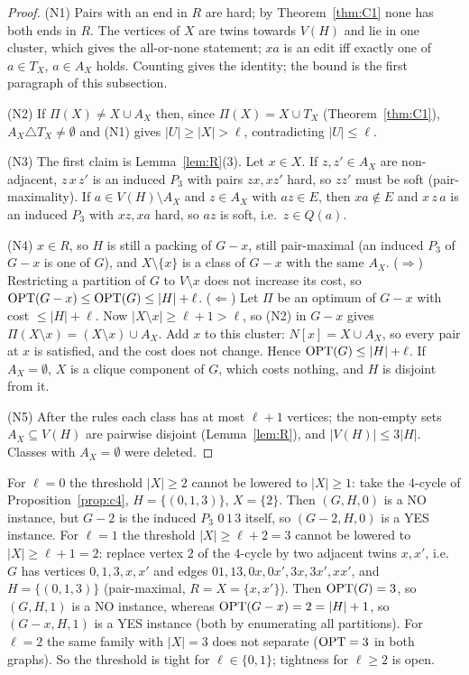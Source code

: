 \begin{proof}
(N1) Pairs with an end in $R$ are hard; by Theorem~\ref{thm:C1} none has both ends in $R$. The vertices of $X$ are twins towards $V(H)$ and lie in one cluster, which gives the all-or-none statement; $xa$ is an edit iff exactly one of $a\in T_X$, $a\in A_X$ holds. Counting gives the identity; the bound is the first paragraph of this subsection.

(N2) If $\Pi(X)\ne X\cup A_X$ then, since $\Pi(X)=X\cup T_X$ (Theorem~\ref{thm:C1}), $A_X\triangle T_X\neq\emptyset$ and (N1) gives $|U|\ge|X|>\ell$, contradicting $|U|\le\ell$.

(N3) The first claim is Lemma~\ref{lem:R}(3). Let $x\in X$. If $z,z'\in A_X$ are non-adjacent, $z\,x\,z'$ is an induced $P_3$ with pairs $zx,xz'$ hard, so $zz'$ must be soft (pair-maximality). If $a\in V(H)\setminus A_X$ and $z\in A_X$ with $az\in E$, then $xa\notin E$ and $x\,z\,a$ is an induced $P_3$ with $xz,xa$ hard, so $az$ is soft, i.e.\ $z\in Q(a)$.

(N4) $x\in R$, so $H$ is still a packing of $G-x$, still pair-maximal (an induced $P_3$ of $G-x$ is one of $G$), and $X\setminus\{x\}$ is a class of $G-x$ with the same $A_X$. ($\Rightarrow$) Restricting a partition of $G$ to $V\setminus x$ does not increase its cost, so $\mathrm{OPT}(G-x)\le\mathrm{OPT}(G)\le|H|+\ell$. ($\Leftarrow$) Let $\Pi$ be an optimum of $G-x$ with cost $\le|H|+\ell$. Now $|X\setminus x|\ge\ell+1>\ell$, so (N2) in $G-x$ gives $\Pi(X\setminus x)=(X\setminus x)\cup A_X$. Add $x$ to this cluster: $N[x]=X\cup A_X$, so every pair at $x$ is satisfied, and the cost does not change. Hence $\mathrm{OPT}(G)\le|H|+\ell$. If $A_X=\emptyset$, $X$ is a clique component of $G$, which costs nothing, and $H$ is disjoint from it.

(N5) After the rules each class has at most $\ell+1$ vertices; the non-empty sets $A_X\subseteq V(H)$ are pairwise disjoint (Lemma~\ref{lem:R}), and $|V(H)|\le3|H|$. Classes with $A_X=\emptyset$ were deleted.
\end{proof}

\begin{remark}
For $\ell=0$ the threshold $|X|\ge2$ cannot be lowered to $|X|\ge1$: take the $4$-cycle of Proposition~\ref{prop:c4}, $H=\{(0,1,3)\}$, $X=\{2\}$. Then $(G,H,0)$ is a NO instance, but $G-2$ is the induced $P_3$ $0\,1\,3$ itself, so $(G-2,H,0)$ is a YES instance. For $\ell=1$ the threshold $|X|\ge\ell+2=3$ cannot be lowered to $|X|\ge\ell+1=2$: replace vertex $2$ of the $4$-cycle by two adjacent twins $x,x'$, i.e.\ $G$ has vertices $0,1,3,x,x'$ and edges $01,13,0x,0x',3x,3x',xx'$, and $H=\{(0,1,3)\}$ (pair-maximal, $R=X=\{x,x'\}$). Then $\mathrm{OPT}(G)=3$, so $(G,H,1)$ is a NO instance, whereas $\mathrm{OPT}(G-x)=2=|H|+1$, so $(G-x,H,1)$ is a YES instance (both by enumerating all partitions). For $\ell=2$ the same family with $|X|=3$ does not separate ($\mathrm{OPT}=3$ in both graphs). So the threshold is tight for $\ell\in\{0,1\}$; tightness for $\ell\ge2$ is open.
\end{remark}

